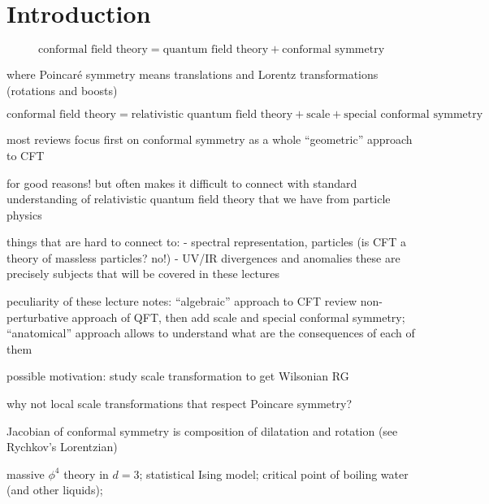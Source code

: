 \documentclass[a4paper,12pt]{article}
\numberwithin{equation}{section}
\begin{document}
\newpage
\section{Introduction}

\begin{equation}
	\text{conformal field theory}
	= \text{quantum field theory} + \text{conformal symmetry}
\end{equation}


where Poincaré symmetry means translations and Lorentz transformations (rotations and boosts)

\begin{equation}
	\text{conformal field theory}
	= \text{relativistic quantum field theory} 
	+ \text{scale}
	+ \text{special conformal symmetry}
\end{equation}

most reviews focus first on conformal symmetry as a whole 
``geometric'' approach to CFT

for good reasons!
but often makes it difficult to connect with standard understanding of relativistic quantum field theory that we have from particle physics

things that are hard to connect to:
- spectral representation, particles (is CFT a theory of massless particles? no!)
- UV/IR divergences and anomalies
these are precisely subjects that will be covered in these lectures

peculiarity of these lecture notes:
``algebraic'' approach to CFT
review non-perturbative approach of QFT, then add scale and special conformal symmetry;
``anatomical'' approach allows to understand what are the consequences of each of them





possible motivation: study scale transformation to get Wilsonian RG

why not local scale transformations that respect Poincare symmetry?

Jacobian of conformal symmetry is composition of dilatation and rotation (see Rychkov's Lorentzian)


massive $\phi^4$ theory in $d = 3$;
statistical Ising model;
critical point of boiling water (and other liquids);
\end{document}
